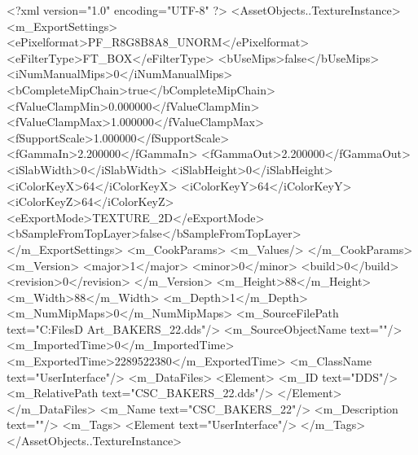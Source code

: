 <?xml version="1.0" encoding="UTF-8" ?>
<AssetObjects..TextureInstance>
	<m_ExportSettings>
		<ePixelformat>PF_R8G8B8A8_UNORM</ePixelformat>
		<eFilterType>FT_BOX</eFilterType>
		<bUseMips>false</bUseMips>
		<iNumManualMips>0</iNumManualMips>
		<bCompleteMipChain>true</bCompleteMipChain>
		<fValueClampMin>0.000000</fValueClampMin>
		<fValueClampMax>1.000000</fValueClampMax>
		<fSupportScale>1.000000</fSupportScale>
		<fGammaIn>2.200000</fGammaIn>
		<fGammaOut>2.200000</fGammaOut>
		<iSlabWidth>0</iSlabWidth>
		<iSlabHeight>0</iSlabHeight>
		<iColorKeyX>64</iColorKeyX>
		<iColorKeyY>64</iColorKeyY>
		<iColorKeyZ>64</iColorKeyZ>
		<eExportMode>TEXTURE_2D</eExportMode>
		<bSampleFromTopLayer>false</bSampleFromTopLayer>
	</m_ExportSettings>
	<m_CookParams>
		<m_Values/>
	</m_CookParams>
	<m_Version>
		<major>1</major>
		<minor>0</minor>
		<build>0</build>
		<revision>0</revision>
	</m_Version>
	<m_Height>88</m_Height>
	<m_Width>88</m_Width>
	<m_Depth>1</m_Depth>
	<m_NumMipMaps>0</m_NumMipMaps>
	<m_SourceFilePath text="C:\Users\Shadow\Desktop\Working Files\2D Art\Quarters\Bakers\CSC_BAKERS_22.dds"/>
	<m_SourceObjectName text=""/>
	<m_ImportedTime>0</m_ImportedTime>
	<m_ExportedTime>2289522380</m_ExportedTime>
	<m_ClassName text="UserInterface"/>
	<m_DataFiles>
		<Element>
			<m_ID text="DDS"/>
			<m_RelativePath text="CSC_BAKERS_22.dds"/>
		</Element>
	</m_DataFiles>
	<m_Name text="CSC_BAKERS_22"/>
	<m_Description text=""/>
	<m_Tags>
		<Element text="UserInterface"/>
	</m_Tags>
</AssetObjects..TextureInstance>

